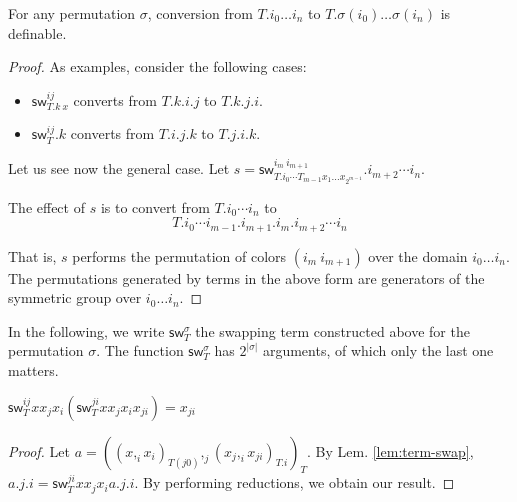 \documentclass[10pt,a4paper]{article}
\newcommand\CC[4]{(#2,_{#1} #3)_{#4}}
\newcommand\sw[2]{\mathsf{sw}^{#1}_{#2}}
\begin{document}
\begin{theorem}
For any permutation $σ$, conversion from $T.i_0 … i_n$ to $T.σ(i_0) …
σ(i_n)$ is definable.

\end{theorem}

\begin{proof}
As examples, consider the following cases:
\begin{itemize}
\item $\sw{ij} {T.k~x}$ converts from $T.k.i.j$ to $T.k.j.i$.
\item $\sw{ij} {T}.k$ converts from $T.i.j.k$ to $T.j.i.k$.
\end{itemize}

Let us see now the general case.
Let $s = \sw{i_m~i_{m+1}} {T.i_0⋯T_{m-1} x_1 … x_{2^{m-1}}}.i_{m+2}⋯i_n$.

The effect of $s$ is to convert from $T.i_0 ⋯ i_n$ to
$$T.i_0⋯i_{m-1}.i_{m+1}.i_m .i_{m+2}⋯i_n$$

That is, $s$ performs the permutation of colors $(i_m~i_{m+1})$ over
the domain $i_0 … i_n$. The permutations generated by terms in the
above form are generators of the symmetric group over $i_0 … i_n$.
\end{proof}

In the following, we write $\sw {σ} T$ the swapping term constructed
above for the permutation $σ$. The function $\sw {σ} T$ has $2^{|σ|}$
arguments, of which only the last one matters.

\begin{lemma}
  $\sw{ij} T x x_j x_i (\sw {ji} T x x_j x_i x_{ji}) = x_{ji}$
\end{lemma}
\begin{proof}
  Let $a = \CC j {\CC i x {x_i} {T(j0)}} {\CC i {x_j} {x_{ji}} {T.i}} T$.
  By Lem. \ref{lem:term-swap}, $a.j.i = \sw {ji} T x x_j x_i
  a.j.i$. By performing reductions, we obtain our result.
\end{proof}
\end{document}
